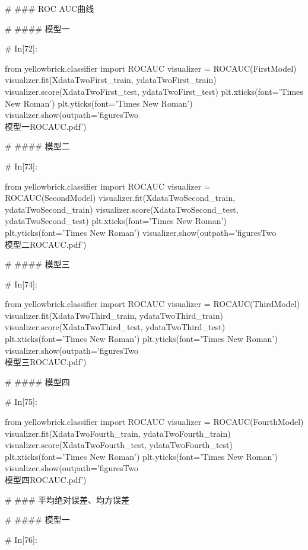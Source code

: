 \documentclass{MathorCupmodeling}
\begin{document}
\begin{python}
# ### ROC AUC曲线

# #### 模型一

# In[72]:


from yellowbrick.classifier import ROCAUC
visualizer = ROCAUC(FirstModel)
visualizer.fit(XdataTwoFirst_train, ydataTwoFirst_train)
visualizer.score(XdataTwoFirst_test, ydataTwoFirst_test)
plt.xticks(font='Times New Roman')
plt.yticks(font='Times New Roman')
visualizer.show(outpath='figuresTwo\\[附件2]模型一ROCAUC.pdf')


# #### 模型二

# In[73]:


from yellowbrick.classifier import ROCAUC
visualizer = ROCAUC(SecondModel)
visualizer.fit(XdataTwoSecond_train, ydataTwoSecond_train)
visualizer.score(XdataTwoSecond_test, ydataTwoSecond_test)
plt.xticks(font='Times New Roman')
plt.yticks(font='Times New Roman')
visualizer.show(outpath='figuresTwo\\[附件2]模型二ROCAUC.pdf')


# #### 模型三

# In[74]:


from yellowbrick.classifier import ROCAUC
visualizer = ROCAUC(ThirdModel)
visualizer.fit(XdataTwoThird_train, ydataTwoThird_train)
visualizer.score(XdataTwoThird_test, ydataTwoThird_test)
plt.xticks(font='Times New Roman')
plt.yticks(font='Times New Roman')
visualizer.show(outpath='figuresTwo\\[附件2]模型三ROCAUC.pdf')


# #### 模型四

# In[75]:


from yellowbrick.classifier import ROCAUC
visualizer = ROCAUC(FourthModel)
visualizer.fit(XdataTwoFourth_train, ydataTwoFourth_train)
visualizer.score(XdataTwoFourth_test, ydataTwoFourth_test)
plt.xticks(font='Times New Roman')
plt.yticks(font='Times New Roman')
visualizer.show(outpath='figuresTwo\\[附件2]模型四ROCAUC.pdf')


# ### 平均绝对误差、均方误差

# #### 模型一

# In[76]:



\end{python}
\end{document}
